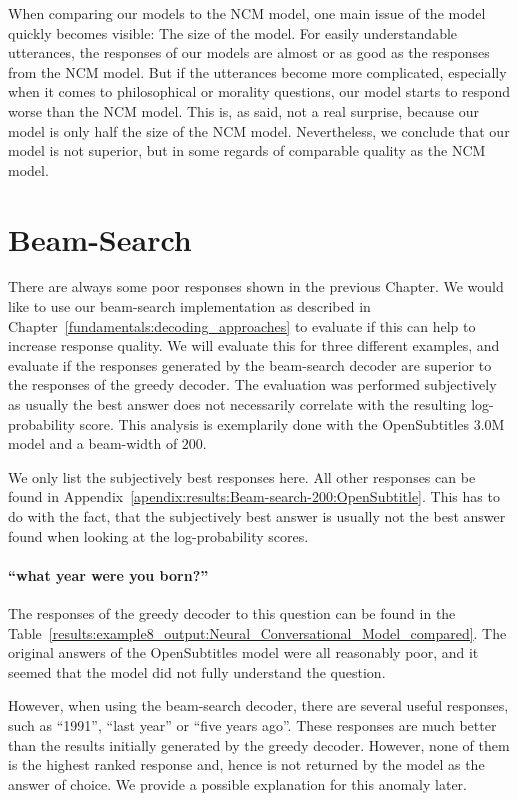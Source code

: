 When comparing our models to the NCM model, one main issue of the model quickly becomes visible: The size of the model. For easily understandable utterances, the responses of our models are almost or as good as the responses from the NCM model. But if the utterances become more complicated, especially when it comes to philosophical or morality questions, our model starts to respond worse than the NCM model. This is, as said, not a real surprise, because our model is only half the size of the NCM model. Nevertheless, we conclude that our model is not superior, but in some regards of comparable quality as the NCM model.

\section{Beam-Search}
\label{results:beam_search}
There are always some poor responses shown in the previous Chapter. We would like to use our beam-search implementation as described in Chapter~\ref{fundamentals:decoding_approaches} to evaluate if this can help to increase response quality. We will evaluate this for three different examples, and evaluate if the responses generated by the beam-search decoder are superior to the responses of the greedy decoder. The evaluation was performed subjectively as usually the best answer does not necessarily correlate with the resulting log-probability score. This analysis is exemplarily done with the OpenSubtitles 3.0M model and a beam-width of $200$.

We only list the subjectively best responses here. All other responses can be found in Appendix~\ref{apendix:results:Beam-search-200:OpenSubtitle}. This has to do with the fact, that the subjectively best answer is usually not the best answer found when looking at the log-probability scores.

\paragraph{``what year were you born?''} The responses of the greedy decoder to this question can be found in the Table~\ref{results:example8_output:Neural_Conversational_Model_compared}. The original answers of the OpenSubtitles model were all reasonably poor, and it seemed that the model did not fully understand the question.

However, when using the beam-search decoder, there are several useful responses, such as ``1991'', ``last year'' or ``five years ago''. These responses are much better than the results initially generated by the greedy decoder. However, none of them is the highest ranked response and, hence is not returned by the model as the answer of choice. We provide a possible explanation for this anomaly later.

